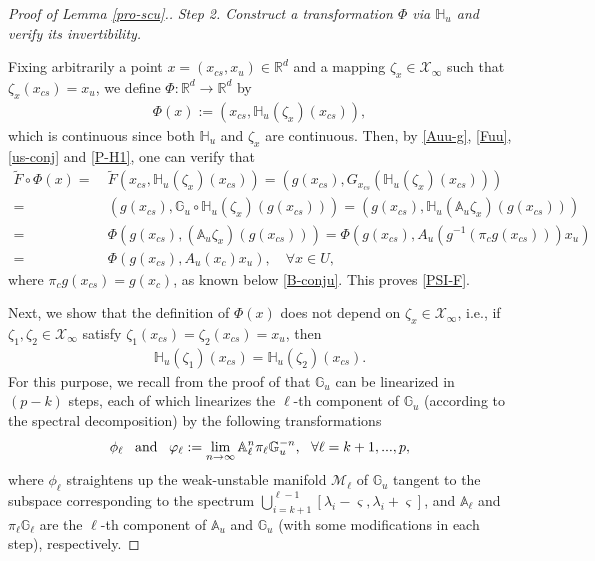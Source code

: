 \documentclass[reqno]{amsart}
\numberwithin{equation}{section}
\begin{document}
\begin{proof}[Proof of Lemma {\rm \ref{pro-scu}}.]
{\em Step 2.
Construct a transformation $\Phi$ via $\mathbb{H}_u$ and verify its invertibility.
}

Fixing arbitrarily a point $x=(x_{cs},x_u)\in \mathbb{R}^d$ and a mapping
$\zeta_x \in \mathcal{X}_\infty$ such that $\zeta_x(x_{cs}) = x_u$,
we define $\Phi:\mathbb{R}^d\to \mathbb{R}^d$ by
\begin{align}\label{P-H1}
\Phi(x):=(x_{cs},\mathbb{H}_u(\zeta_x)(x_{cs})),
\end{align}
which is continuous since both $\mathbb{H}_u$ and $\zeta_x$ are continuous.
Then, by \eqref{Auu-g}, \eqref{Fuu}, \eqref{us-conj} and \eqref{P-H1}, one can verify that
\begin{align}\label{verf-conj}
\tilde{F}\circ \Phi(x)=&~ \tilde{F} (x_{cs},\mathbb{H}_u(\zeta_x)(x_{cs}))
= (g(x_{cs}),G_{x_{cs}}(\mathbb{H}_u(\zeta_x)(x_{cs})))
\nonumber\\
=&~ (g(x_{cs}),\mathbb{G}_u \circ\mathbb{H}_u(\zeta_x)(g(x_{cs})))
= (g(x_{cs}),\mathbb{H}_u(\mathbb{A}_u \zeta_x)(g(x_{cs})))
\nonumber\\
=&~ \Phi(g(x_{cs}),(\mathbb{A}_u \zeta_x)(g(x_{cs})))=\Phi(g(x_{cs}),A_u(g^{-1}(\pi_c g(x_{cs})))x_u)
\nonumber\\
=&~\Phi(g(x_{cs}),A_u(x_c)x_u),\quad \forall x\in U,
\end{align}
where $\pi_c g(x_{cs})=g(x_c)$, as known below \eqref{B-conju}.
This proves \eqref{PSI-F}.

Next, we show that the definition of $\Phi(x)$ does not depend on $\zeta_x\in \mathcal{X}_\infty$, i.e., if $\zeta_1,\zeta_2\in \mathcal{X}_\infty$ satisfy $\zeta_1(x_{cs})=\zeta_2(x_{cs})=x_u$, then
\begin{align}\label{Hu=Hu}
\mathbb{H}_u(\zeta_1)(x_{cs})=\mathbb{H}_u(\zeta_2)(x_{cs}).
\end{align}
For this purpose, we recall from the proof of \cite[Lemma 6.2]{ZLZ-TAMS} that $\mathbb{G}_u$ can be linearized in $(p-k)$ steps, each of which linearizes the
$\ell$-th component of $\mathbb{G}_u$ (according to the   spectral decomposition) by the following transformations
$$
\text{$\phi_{\ell}$ \, and \, $\varphi_\ell:=\lim_{n\to \infty} \mathbb{A}_\ell^{n} \pi_\ell \mathbb{G}_u^{-n}$,   \, $\forall \ell=k+1,...,p,$}
$$
where $\phi_\ell$ straightens up the weak-unstable manifold $\mathcal{M}_{\ell}$ of $\mathbb{G}_u$ tangent to the subspace corresponding to the spectrum $\bigcup_{i=k+1}^{\ell-1} [\lambda_i-\varsigma,\lambda_i+\varsigma]$, and $\mathbb{A}_\ell$
and $\pi_\ell \mathbb{G}_\ell$ are the $\ell$-th component of $\mathbb{A}_u$ and $\mathbb{G}_u$ (with some modifications in each step), respectively.


\end{proof}
\end{document}

